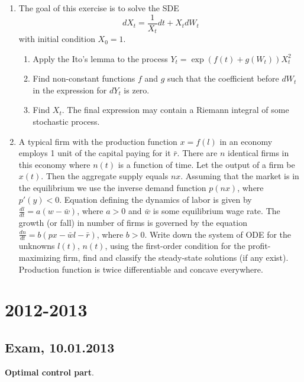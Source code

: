 \documentclass[pdftex,12pt,a4paper]{article}
\begin{document}
\begin{enumerate}
\item The goal of this exercise is to solve the SDE
\begin{equation}
dX_t=\frac{1}{X_t}dt+X_tdW_t \nonumber
\end{equation}
with initial condition  $X_0=1$.
\begin{enumerate}
\item Apply the Ito's lemma to the process $Y_t=\exp(f(t)+g(W_t))X_t^2$
\item Find non-constant functions $f$ and $g$ such that the coefficient before $dW_t$ in the expression for $dY_t$ is zero.
\item Find $X_t$. The final expression may contain a Riemann integral of some stochastic process.
\end{enumerate}

\item A typical firm with the production function $x=f(l)$ in an economy employs 1 unit of the capital paying for it $\bar{r}$. There are $n$ identical firms in this economy where $n(t)$ is a function of time. Let the output of a firm be $x(t)$. Then the aggregate supply equals $nx$. Assuming that the market is in the equilibrium we use the inverse demand function $p(nx)$, where $p'(y)<0$. Equation defining the dynamics of labor is given by $\frac{dl}{dt}=a(w-\bar{w})$, where $a>0$  and $\bar{w}$  is some equilibrium wage rate. The growth (or fall) in number of firms is governed by the equation $\frac{dn}{dt}=b(px-\bar{w}l-\bar{r})$, where $b>0$. Write down the system of ODE for the unknowns $l(t)$, $n(t)$, using the first-order condition for the profit-maximizing firm, find and classify the steady-state solutions (if any exist). Production function is twice differentiable and concave everywhere.

\end{enumerate}

\section{2012-2013}

\subsection{Exam, 10.01.2013}

\textbf{Optimal control part}.  

\vspace{20pt}
\end{document}

